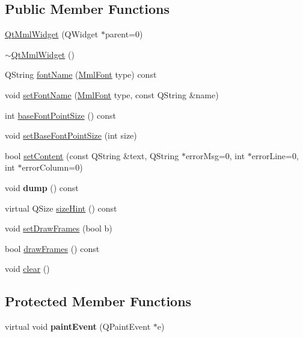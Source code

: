\subsection*{Public Member Functions}
\begin{DoxyCompactItemize}
\item 
\mbox{\hyperlink{class_qt_mml_widget_a05b1ec7dcada67400486439a0650fca6}{Qt\+Mml\+Widget}} (Q\+Widget $\ast$parent=0)
\item 
\mbox{\hyperlink{class_qt_mml_widget_a9b3e3f0caac040257873da12b8e80603}{$\sim$\+Qt\+Mml\+Widget}} ()
\item 
Q\+String \mbox{\hyperlink{class_qt_mml_widget_ab8a069c5d6a449e3d9d67e6b818172d9}{font\+Name}} (\mbox{\hyperlink{class_qt_mml_widget_ac3fde39f7b605557d80bded69f985d2a}{Mml\+Font}} type) const
\item 
void \mbox{\hyperlink{class_qt_mml_widget_afbc5b98c9d39c328270a9d65d58b0b7a}{set\+Font\+Name}} (\mbox{\hyperlink{class_qt_mml_widget_ac3fde39f7b605557d80bded69f985d2a}{Mml\+Font}} type, const Q\+String \&name)
\item 
int \mbox{\hyperlink{class_qt_mml_widget_ab255d9d35bca5f04d5828fabed87d5af}{base\+Font\+Point\+Size}} () const
\item 
void \mbox{\hyperlink{class_qt_mml_widget_ab13b093180da6bc6e9f928f4a02321a8}{set\+Base\+Font\+Point\+Size}} (int size)
\item 
bool \mbox{\hyperlink{class_qt_mml_widget_acbf8373b12e69b14458b56bcb9ccc9c3}{set\+Content}} (const Q\+String \&text, Q\+String $\ast$error\+Msg=0, int $\ast$error\+Line=0, int $\ast$error\+Column=0)
\item 
\mbox{\label{class_qt_mml_widget_ad65232613f2a63db1a306bf4e4008aa7}} 
void {\bfseries dump} () const
\item 
virtual Q\+Size \mbox{\hyperlink{class_qt_mml_widget_ab67ec3ebb921484598b65d839dddd0b0}{size\+Hint}} () const
\item 
void \mbox{\hyperlink{class_qt_mml_widget_ad24aab1ee535bc028e730b620b3232dc}{set\+Draw\+Frames}} (bool b)
\item 
bool \mbox{\hyperlink{class_qt_mml_widget_a744050e1126d7713c806fcd9c8ae545f}{draw\+Frames}} () const
\item 
void \mbox{\hyperlink{class_qt_mml_widget_a96de78046ab6ea13c1e4dc4d0bae0bf9}{clear}} ()
\end{DoxyCompactItemize}
\subsection*{Protected Member Functions}
\begin{DoxyCompactItemize}
\item 
\mbox{\label{class_qt_mml_widget_a5457dd28e50302ec6ff842872ac8a990}} 
virtual void {\bfseries paint\+Event} (Q\+Paint\+Event $\ast$e)
\end{DoxyCompactItemize}


